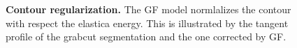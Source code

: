 \documentclass[smallextended]{svjour3}
\begin{document}
\begin{figure}
\caption{\textbf{Contour regularization.} The GF model normlalizes the contour with respect the elastica energy. This is illustrated by the tangent profile of the grabcut segmentation and the one corrected by GF.}
\label{fig:coco-tangent-profile}
\end{figure}
%
%
\end{document}
